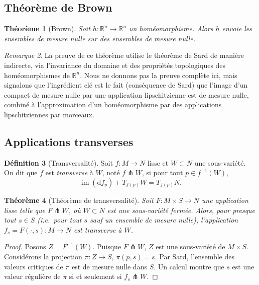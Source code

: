 \documentclass[12pt,a4paper,openany]{book}
\theoremstyle{definition}
\newtheorem{definition}{Définition}[chapter]
\theoremstyle{plain}
\newtheorem{theoreme}[definition]{Théorème}
\theoremstyle{remark}
\newtheorem{remarque}[definition]{Remarque}
\newcommand{\R}{\mathbb{R}}
\DeclareMathOperator{\im}{im}
\newcommand{\dd}{\mathrm{d}}
\begin{document}
\subsection{Théorème de Brown}\label{ssec:brown}

\begin{theoreme}[Brown]\label{thm:brown}
Soit $h \colon \R^n \to \R^n$ un homéomorphisme. Alors $h$ envoie les
ensembles de mesure nulle sur des ensembles de mesure nulle.
\end{theoreme}

\begin{remarque}\label{rem:brown-apercu}
La preuve de ce théorème utilise le théorème de Sard de manière indirecte, via
l'invariance du domaine et des propriétés topologiques des homéomorphismes de
$\R^n$. Nous ne donnons pas la preuve complète ici, mais signalons que
l'ingrédient clé est le fait (conséquence de Sard) que l'image d'un compact
de mesure nulle par une application lipschitzienne est de mesure nulle, combiné
à l'approximation d'un homéomorphisme par des applications lipschitziennes
par morceaux.
\end{remarque}

\subsection{Applications transverses}\label{ssec:transverses}

\begin{definition}[Transversalité]\label{def:transversalite-rappel}
Soit $f \colon M \to N$ lisse et $W \subset N$ une sous-variété. On dit que
$f$ est \emph{transverse} à $W$, noté $f \pitchfork W$, si pour tout
$p \in f^{-1}(W)$,
\[
  \im(\dd f_p) + T_{f(p)}W = T_{f(p)}N.
\]
\end{definition}

\begin{theoreme}[Théorème de transversalité]\label{thm:transversalite-sard}
Soit $F \colon M \times S \to N$ une application lisse telle que
$F \pitchfork W$, où $W \subset N$ est une sous-variété fermée. Alors,
pour presque tout $s \in S$ (i.e.\ pour tout $s$ sauf un ensemble de
mesure nulle), l'application $f_s = F(\cdot, s) \colon M \to N$ est
transverse à $W$.
\end{theoreme}

\begin{proof}
Posons $Z = F^{-1}(W)$. Puisque $F \pitchfork W$, $Z$ est une sous-variété
de $M \times S$. Considérons la projection $\pi \colon Z \to S$,
$\pi(p, s) = s$. Par Sard, l'ensemble des valeurs critiques de $\pi$ est de
mesure nulle dans $S$. Un calcul montre que $s$ est une valeur régulière de
$\pi$ si et seulement si $f_s \pitchfork W$.
\end{proof}
\end{document}
